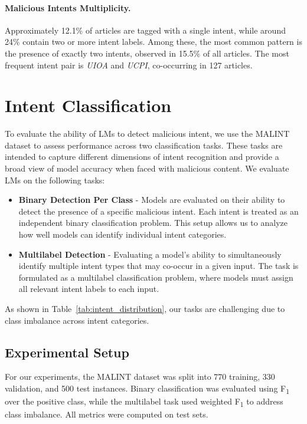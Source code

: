 \documentclass[11pt]{article}
\begin{document}
\paragraph{Malicious Intents Multiplicity.}
Approximately 12{.}1\% of articles are tagged with a single intent, while around 24\% contain two or more intent labels. Among these, the most common pattern is the presence of exactly two intents, observed in 15{.}5\% of all articles. The most frequent intent pair is \textit{UIOA} and \textit{UCPI}, co-occurring in 127 articles.


\section{Intent Classification}
\label{sec:lms_evaluation}

To evaluate the ability of LMs to detect malicious intent, we use the MALINT dataset to assess performance across two classification tasks. These tasks are intended to capture different dimensions of intent recognition and provide a broad view of model accuracy when faced with malicious content. We evaluate LMs on the following tasks:



\begin{itemize}[nosep, leftmargin=*]
    \item \textbf{Binary Detection Per Class} -  Models are evaluated on their ability to detect the presence of a specific malicious intent. Each intent is treated as an independent binary classification problem. This setup allows us to analyze how well models can identify individual intent categories.
    
    \item \textbf{Multilabel Detection} - Evaluating a model's ability to simultaneously identify multiple intent types that may co-occur in a given input. The task is formulated as a multilabel classification problem, where models must assign all relevant intent labels to each input.
\end{itemize}
As shown in Table~\ref{tab:intent_distribution}, our tasks are challenging due to class imbalance across intent categories.

\subsection{Experimental Setup}

For our experiments, the MALINT dataset was split into 770 training, 330 validation, and 500 test instances. Binary classification was evaluated using F\textsubscript{1} over the positive class, while the multilabel task used weighted F\textsubscript{1} to address class imbalance. All metrics were computed on test sets.
\end{document}
